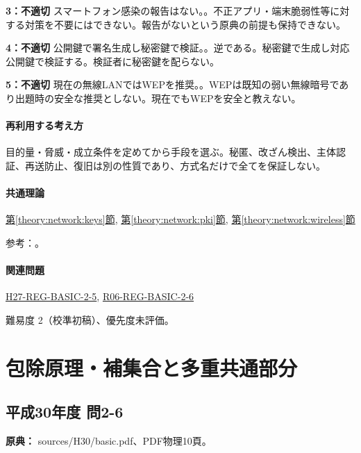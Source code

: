\noindent\textbf{3：不適切} スマートフォン感染の報告はない。。不正アプリ・端末脆弱性等に対する対策を不要にはできない。報告がないという原典の前提も保持できない。\par

\noindent\textbf{4：不適切} 公開鍵で署名生成し秘密鍵で検証。。逆である。秘密鍵で生成し対応公開鍵で検証する。検証者に秘密鍵を配らない。\par

\noindent\textbf{5：不適切} 現在の無線LANではWEPを推奨。。WEPは既知の弱い無線暗号であり出題時の安全な推奨としない。現在でもWEPを安全と教えない。\par

\paragraph{再利用する考え方} 目的量・脅威・成立条件を定めてから手段を選ぶ。秘匿、改ざん検出、主体認証、再送防止、復旧は別の性質であり、方式名だけで全てを保証しない。

\paragraph{共通理論} \hyperref[theory:network:keys]{第\ref*{theory:network:keys}節}, \hyperref[theory:network:pki]{第\ref*{theory:network:pki}節}, \hyperref[theory:network:wireless]{第\ref*{theory:network:wireless}節}

\par 参考：\cite{net_pki,net_signature,net_wep}。

\paragraph{関連問題} \hyperref[q:h27-reg-basic-2-5]{H27-REG-BASIC-2-5}, \hyperref[q:r06-reg-basic-2-6]{R06-REG-BASIC-2-6}

\par 難易度 2（校準初稿）、優先度未評価。

\section{包除原理・補集合と多重共通部分}

\subsection{平成30年度 問2-6}
\label{q:h30-reg-basic-2-6}

\noindent\textbf{原典：} sources/H30/basic.pdf、PDF物理10頁。

